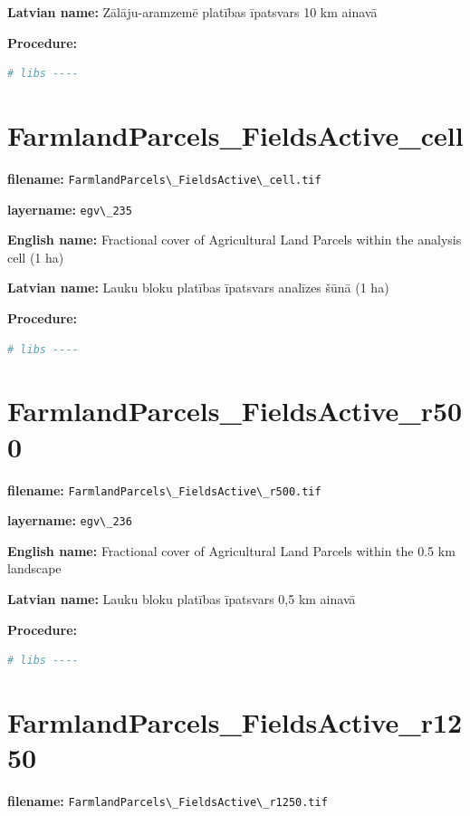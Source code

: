 \documentclass[
]{book}
\newcommand{\passthrough}[1]{#1}
\begin{document}
\textbf{Latvian name:} Zālāju-aramzemē platības īpatsvars 10 km ainavā

\textbf{Procedure:}

\begin{lstlisting}[language=R]
# libs ----
\end{lstlisting}

\section{FarmlandParcels\_FieldsActive\_cell}\label{ch06.235}

\textbf{filename:} \passthrough{\lstinline!FarmlandParcels\_FieldsActive\_cell.tif!}

\textbf{layername:} \passthrough{\lstinline!egv\_235!}

\textbf{English name:} Fractional cover of Agricultural Land Parcels within the analysis cell (1 ha)

\textbf{Latvian name:} Lauku bloku platības īpatsvars analīzes šūnā (1 ha)

\textbf{Procedure:}

\begin{lstlisting}[language=R]
# libs ----
\end{lstlisting}

\section{FarmlandParcels\_FieldsActive\_r500}\label{ch06.236}

\textbf{filename:} \passthrough{\lstinline!FarmlandParcels\_FieldsActive\_r500.tif!}

\textbf{layername:} \passthrough{\lstinline!egv\_236!}

\textbf{English name:} Fractional cover of Agricultural Land Parcels within the 0.5 km landscape

\textbf{Latvian name:} Lauku bloku platības īpatsvars 0,5 km ainavā

\textbf{Procedure:}

\begin{lstlisting}[language=R]
# libs ----
\end{lstlisting}

\section{FarmlandParcels\_FieldsActive\_r1250}\label{ch06.237}

\textbf{filename:} \passthrough{\lstinline!FarmlandParcels\_FieldsActive\_r1250.tif!}
\end{document}
